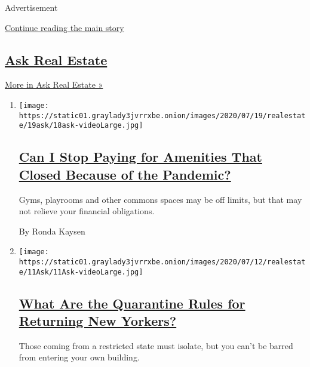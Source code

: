 Advertisement

\protect\hyperlink{after-mid1}{Continue reading the main story}

\hypertarget{ask-real-estate-1}{%
\subsection{\texorpdfstring{\href{/column/ask-real-estate}{Ask Real
Estate}}{Ask Real Estate}}\label{ask-real-estate-1}}

\href{/column/ask-real-estate}{More in Ask Real Estate »}

\begin{enumerate}
\def\labelenumi{\arabic{enumi}.}
\item
  \texttt{[image: https://static01.graylady3jvrrxbe.onion/images/2020/07/19/realestate/19ask/18ask-videoLarge.jpg]}

  \hypertarget{can-i-stop-paying-for-amenities-that-closed-because-of-the-pandemic}{%
  \subsection{\texorpdfstring{\href{/2020/07/18/realestate/gym-playroom-fees-coronavirus.html}{Can
  I Stop Paying for Amenities That Closed Because of the
  Pandemic?}}{Can I Stop Paying for Amenities That Closed Because of the Pandemic?}}\label{can-i-stop-paying-for-amenities-that-closed-because-of-the-pandemic}}

  Gyms, playrooms and other commons spaces may be off limits, but that
  may not relieve your financial obligations.

  By Ronda Kaysen
\item
  \texttt{[image: https://static01.graylady3jvrrxbe.onion/images/2020/07/12/realestate/11Ask/11Ask-videoLarge.jpg]}

  \hypertarget{what-are-the-quarantine-rules-for-returning-new-yorkers}{%
  \subsection{\texorpdfstring{\href{/2020/07/11/realestate/what-are-the-quarantine-rules-for-returning-new-yorkers-coronavirus.html}{What
  Are the Quarantine Rules for Returning New
  Yorkers?}}{What Are the Quarantine Rules for Returning New Yorkers?}}\label{what-are-the-quarantine-rules-for-returning-new-yorkers}}

  Those coming from a restricted state must isolate, but you can't be
  barred from entering your own building.


\end{enumerate}
